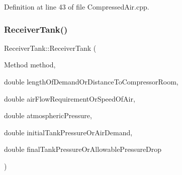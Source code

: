 Definition at line 43 of file Compressed\+Air.\+cpp.

\mbox{\label{class_receiver_tank_a499e102ca118bfe3bdff3584310207c2}} 
\subsubsection{\texorpdfstring{Receiver\+Tank()}{ReceiverTank()}\hspace{0.1cm}{\footnotesize\ttfamily [2/3]}}
{\footnotesize\ttfamily Receiver\+Tank\+::\+Receiver\+Tank (\begin{DoxyParamCaption}\item[{Method}]{method,  }\item[{double}]{length\+Of\+Demand\+Or\+Distance\+To\+Compressor\+Room,  }\item[{double}]{air\+Flow\+Requirement\+Or\+Speed\+Of\+Air,  }\item[{double}]{atmospheric\+Pressure,  }\item[{double}]{initial\+Tank\+Pressure\+Or\+Air\+Demand,  }\item[{double}]{final\+Tank\+Pressure\+Or\+Allowable\+Pressure\+Drop }\end{DoxyParamCaption})}

